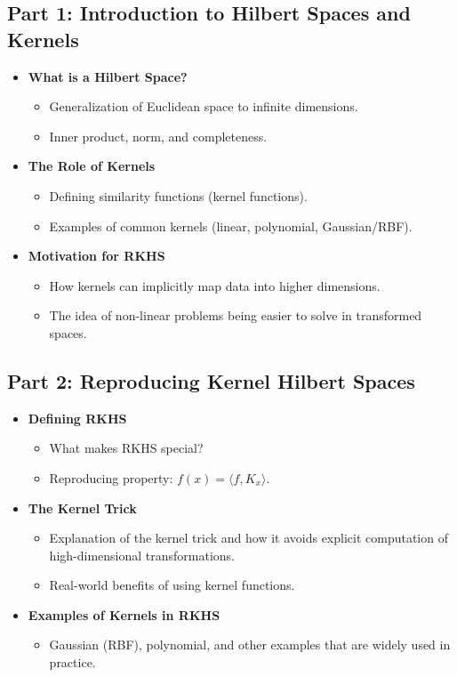\documentclass[a4paper]{article}
\begin{document}
\subsection*{Part 1: Introduction to Hilbert Spaces and Kernels}
\begin{itemize}
    \item \textbf{What is a Hilbert Space?}
    \begin{itemize}
        \item Generalization of Euclidean space to infinite dimensions.
        \item Inner product, norm, and completeness.
    \end{itemize}
    \item \textbf{The Role of Kernels}
    \begin{itemize}
        \item Defining similarity functions (kernel functions).
        \item Examples of common kernels (linear, polynomial, Gaussian/RBF).
    \end{itemize}
    \item \textbf{Motivation for RKHS}
    \begin{itemize}
        \item How kernels can implicitly map data into higher dimensions.
        \item The idea of non-linear problems being easier to solve in transformed spaces.
    \end{itemize}
\end{itemize}

\subsection*{Part 2: Reproducing Kernel Hilbert Spaces}
\begin{itemize}
    \item \textbf{Defining RKHS}
    \begin{itemize}
        \item What makes RKHS special?
        \item Reproducing property: \( f(x) = \langle f, K_x \rangle \).
    \end{itemize}
    \item \textbf{The Kernel Trick}
    \begin{itemize}
        \item Explanation of the kernel trick and how it avoids explicit computation of high-dimensional transformations.
        \item Real-world benefits of using kernel functions.
    \end{itemize}
    \item \textbf{Examples of Kernels in RKHS}
    \begin{itemize}
        \item Gaussian (RBF), polynomial, and other examples that are widely used in practice.
    \end{itemize}
\end{itemize}
\end{document}
